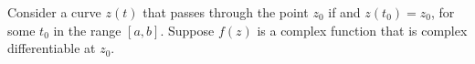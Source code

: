 %




%	
%




Consider a curve $z(t)$ that passes through the point $z_0$ if and $z(t_0) = z_0$, for some $t_0$ in the range $[a,b]$. 
Suppose $f(z)$ is a complex function that is complex differentiable at $z_0$.


